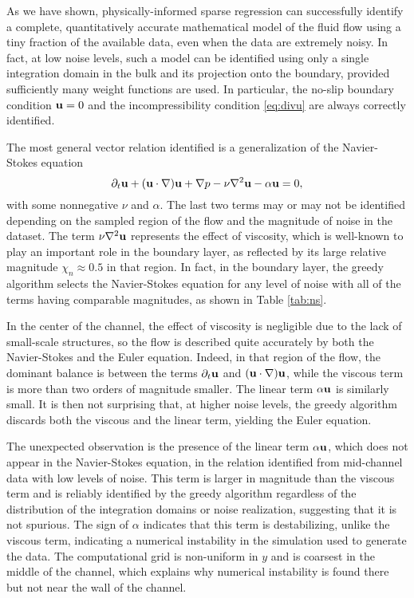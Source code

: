 \documentclass[
 reprint,
 amsmath,amssymb,
 aps,
]{revtex4-2}
\begin{document}
As we have shown, physically-informed sparse regression can successfully identify a complete, quantitatively accurate mathematical model of the fluid flow using a tiny fraction of the available data, even when the data are extremely noisy. In fact, at low noise levels, such a model can be identified using only a single integration domain in the bulk and its projection onto the boundary, provided sufficiently many weight functions are used. In particular, the no-slip boundary condition ${\bf u}=0$ and the incompressibility condition \eqref{eq:divu} are always correctly identified. 

The most general vector relation identified is a generalization of the Navier-Stokes equation
\begin{equation} \label{eq:unstable}
    \partial_t{\bf u}+({\bf u}\cdot\nabla){\bf u}+\nabla p-\nu\nabla^2{\bf u}-\alpha{\bf u}=0,
\end{equation}
with some nonnegative $\nu$ and $\alpha$. The last two terms may or may not be identified depending on the sampled region of the flow and the magnitude of noise in the dataset. The term $\nu\nabla^2{\bf u}$ represents the effect of viscosity, which is well-known to play an important role in the boundary layer, as reflected by its large relative magnitude ${\chi_n\approx 0.5}$ in that region. In fact, in the boundary layer, the greedy algorithm selects the Navier-Stokes equation for any level of noise with all of the terms having comparable magnitudes, as shown in Table \ref{tab:ns}. 

In the center of the channel, the effect of viscosity is negligible due to the lack of small-scale structures, so the flow is described quite accurately by both the Navier-Stokes and the Euler equation. Indeed, in that region of the flow, the dominant balance is between the terms $\partial_t{\bf u}$ and $({\bf u}\cdot\nabla){\bf u}$, while the viscous term is more than two orders of magnitude smaller. The linear term $\alpha{\bf u}$ is similarly small. It is then not surprising that, at higher noise levels, the greedy algorithm discards both the viscous and the linear term, yielding the Euler equation.

The unexpected observation is the presence of the linear term $\alpha{\bf u}$, which does not appear in the Navier-Stokes equation, in the relation identified from mid-channel data with low levels of noise. This term is larger in magnitude than the viscous term and is reliably identified by the greedy algorithm regardless of the distribution of the integration domains or noise realization, suggesting that it is not spurious. The sign of $\alpha$ indicates that this term is destabilizing, unlike the viscous term, indicating a numerical instability in the simulation used to generate the data. The computational grid is non-uniform in $y$ and is coarsest in the middle of the channel, which explains why numerical instability is found there but not near the wall of the channel.
\end{document}
